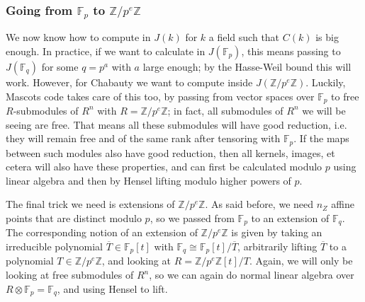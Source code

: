 \documentclass[12pt]{article}
\newcommand{\Z}{\mathbb{Z}}
\newcommand{\F}{\mathbb{F}}
\newcommand{\tensor}{\otimes}
\theoremstyle{plain}
\theoremstyle{definition}
\theoremstyle{remark}
\begin{document}
\subsubsection{Going from \texorpdfstring{$\F_p$}{Fp} to \texorpdfstring{$\Z/p^e\Z$}{Z/peZ}}
We now know how to compute in $J(k)$ for $k$ a field such that $C(k)$ is big enough. In practice, if we want to calculate in $J(\F_p)$, this means passing to $J(\F_q)$ for some $q = p^a$ with $a$ large enough; by the Hasse-Weil bound this will work. However, for Chabauty we want to compute inside $J(\Z/p^e\Z)$. Luckily, Mascots code takes care of this too, by passing from vector spaces over $\F_p$ to free $R$-submodules of $R^n$ with $R = \Z/p^e\Z$; in fact, all submodules of $R^n$ we will be seeing are free. That means all these submodules will have good reduction, i.e. they will remain free and of the same rank after tensoring with $\F_p$. If the maps between such modules also have good reduction, then all kernels, images, et cetera will also have these properties, and can first be calculated modulo $p$ using linear algebra and then by Hensel lifting modulo higher powers of $p$.

The final trick we need is extensions of $\Z/p^e\Z$. As said before, we need $n_Z$ affine points that are distinct modulo $p$, so we passed from $\F_p$ to an extension of $\F_q$. The corresponding notion of an extension of $\Z/p^e\Z$ is given by taking an irreducible polynomial $\overline{T} \in \F_p[t]$ with $\F_q \cong \F_p[t]/\overline{T}$, arbitrarily lifting $\overline{T}$ to a polynomial $T \in \Z/p^e\Z$, and looking at $R = \Z/p^e\Z[t]/T$. Again, we will only be looking at free submodules of $R^n$, so we can again do normal linear algebra over $R \tensor \F_p = \F_q$, and using Hensel to lift.
\end{document}
